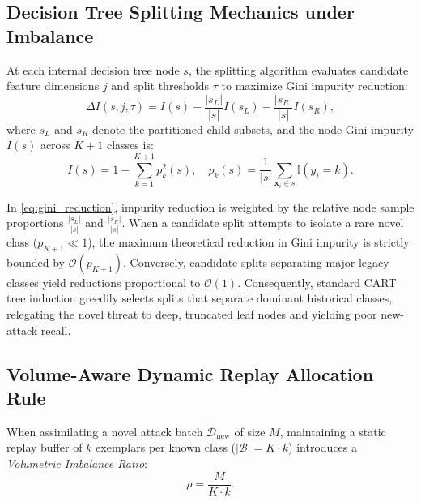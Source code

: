 \documentclass[conference]{IEEEtran}
\begin{document}
\subsection{Decision Tree Splitting Mechanics under Imbalance}
At each internal decision tree node $s$, the splitting algorithm evaluates candidate feature dimensions $j$ and split thresholds $\tau$ to maximize Gini impurity reduction:
\begin{equation}
\Delta I(s, j, \tau) = I(s) - \frac{|s_L|}{|s|} I(s_L) - \frac{|s_R|}{|s|} I(s_R),
\label{eq:gini_reduction}
\end{equation}
where $s_L$ and $s_R$ denote the partitioned child subsets, and the node Gini impurity $I(s)$ across $K+1$ classes is:
\begin{equation}
I(s) = 1 - \sum_{k=1}^{K+1} p_k^2(s), \quad p_k(s) = \frac{1}{|s|} \sum_{\mathbf{x}_i \in s} \mathbb{I}(y_i = k).
\label{eq:gini_impurity}
\end{equation}

In \eqref{eq:gini_reduction}, impurity reduction is weighted by the relative node sample proportions $\frac{|s_L|}{|s|}$ and $\frac{|s_R|}{|s|}$. When a candidate split attempts to isolate a rare novel class ($p_{K+1} \ll 1$), the maximum theoretical reduction in Gini impurity is strictly bounded by $\mathcal{O}(p_{K+1})$. Conversely, candidate splits separating major legacy classes yield reductions proportional to $\mathcal{O}(1)$. Consequently, standard CART tree induction greedily selects splits that separate dominant historical classes, relegating the novel threat to deep, truncated leaf nodes and yielding poor new-attack recall.

\subsection{Volume-Aware Dynamic Replay Allocation Rule}
When assimilating a novel attack batch $\mathcal{D}_{\text{new}}$ of size $M$, maintaining a static replay buffer of $k$ exemplars per known class ($|\mathcal{B}| = K \cdot k$) introduces a \emph{Volumetric Imbalance Ratio}:
\begin{equation}
\rho = \frac{M}{K \cdot k}.
\label{eq:rho}
\end{equation}
\end{document}
